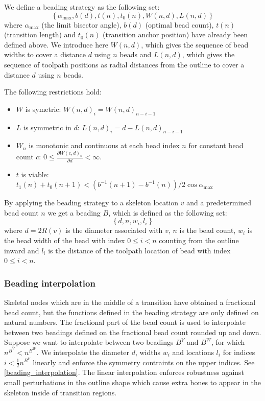 \begin{definition}
We define a beading strategy as the following set:
$$
\left\{ \alpha_\text{max}, b(d), t(n), t_0(n), W(n, d), L(n, d) \right\}
$$
where
$\alpha_{\text{max}}$ (the limit bisector angle),
$b(d)$ (optimal bead count),
$t(n)$ (transition length)
and
$t_0(n)$ (transition anchor position) have already been defined above.
We introduce here
$W(n, d)$, which gives the sequence of bead widths to cover a distance $d$ using $n$ beads
and
$L(n, d)$, which gives the sequence of toolpath positions as radial distances from the outline to cover a distance $d$ using $n$ beads.
\end{definition}


The following restrictions hold:
\begin{itemize}
\item $W$ is symetric: $W(n, d)_i = W(n, d)_{n-i-1}$
\item $L$ is symmetric in $d$: $L(n, d)_i = d - L(n, d)_{n-i-1}$
\item $W_n$ is monotonic and continuous at each bead index $n$ for constant bead count $c$: $0 \leq \frac{\partial W(c, d)_n}{\partial d} < \infty$.
\item $t$ is viable:   \\ $t_1(n) + t_0(n+1) < \left( b^{-1}(n + 1) - b^{-1}(n) \right) /{2 \cos \alpha_\text{max}}$
\end{itemize}


\begin{definition}
By applying the beading strategy to a skeleton location $v$ and a predetermined bead count $n$ we get a beading $B$, which is defined as the following set:
$$
\left\{ d, n, w_i, l_i  \right\}
$$
where
$d = 2 R(v)$ is the diameter associated with $v$,
$n$ is the bead count,
$w_i$ is the bead width of the bead with index $0 \leq i < n$ counting from the outline inward
and
$l_i$ is the distance of the toolpath location of bead with index $0 \leq i < n$.
\end{definition}



\subsubsection{Beading interpolation}\label{section_beading_interpolation}
Skeletal nodes which are in the middle of a transition have obtained a fractional bead count, but the functions defined in the beading strategy are only defined on natural numbers.
The fractional part of the bead count is used to interpolate between two beadings defined on the fractional bead count rounded up and down.
Suppose we want to interpolate between two beadings $B^V$ and $B^W$, for which $n^{B^V} < n^{B^W}$.
We interpolate the diameter $d$, widths $w_i$ and locations $l_i$ for indices $i < \frac12 n^{B^V}$ linearly and enforce the symmetry contraints on the upper indices.
See \cref{beading_interpolation}.
The linear interpolation enforces robustness against small perturbations in the outline shape which cause extra bones to appear in the skeleton inside of transition regions.

